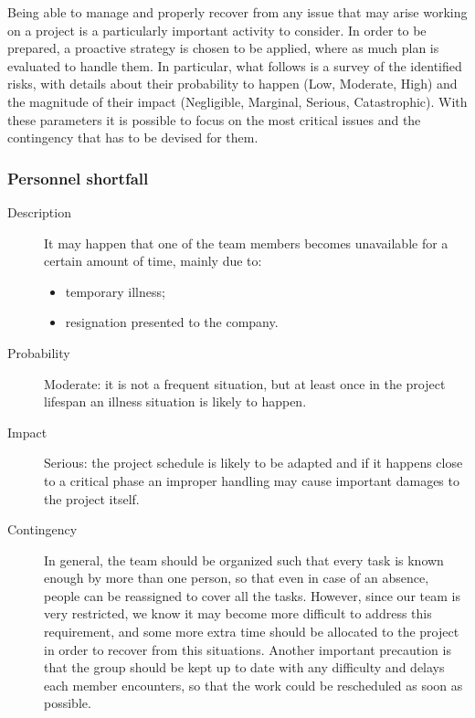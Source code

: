 Being able to manage and properly recover from any issue that may arise working on a project is a particularly important activity to consider. In order to be prepared, a proactive strategy is chosen to be applied, where as much plan is evaluated to handle them. In particular, what follows is a survey of the identified risks, with details about their probability to happen (Low, Moderate, High) and the magnitude of their impact (Negligible, Marginal, Serious, Catastrophic). With these parameters it is possible to focus on the most critical issues and the contingency that has to be devised for them.

\subsubsection*{Personnel shortfall}
	\begin{description}
		\item[Description] It may happen that one of the team members becomes unavailable for a certain amount of time, mainly due to:
			\begin{itemize}
				\item temporary illness;
				\item resignation presented to the company.
			\end{itemize}
		\item[Probability] Moderate: it is not a frequent situation, but at least once in the project lifespan an illness situation is likely to happen.
		\item[Impact] Serious: the project schedule is likely to be adapted and if it happens close to a critical phase an improper handling may cause important damages to the project itself.
		\item[Contingency] In general, the team should be organized such that every task is known enough by more than one person, so that even in case of an absence, people can be reassigned to cover all the tasks. However, since our team is very restricted, we know it may become more difficult to address this requirement, and some more extra time should be allocated to the project in order to recover from this situations. Another important precaution is that the group should be kept up to date with any difficulty and delays each member encounters, so that the work could be rescheduled as soon as possible.
	\end{description}

